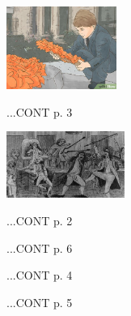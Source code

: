 \documentclass{article}
\begin{document}
\maketitle

\begin{floatingfigure}[l]{0.29\textwidth}
\includegraphics[width=0.27\textwidth]{images/img-02-09-01}
\end{floatingfigure}
\lipsum[1-2][2-15]
...CONT p. 3
\closearticle

\begin{floatingfigure}[r]{0.3\textwidth}
\includegraphics[width=0.29\textwidth]{images/img-02-09-02}
\end{floatingfigure}
\lipsum[3-4][1-13]
...CONT p. 2
\closearticle

\begin{multicols}{3}
\lipsum[6][2-8]
...CONT p. 6

\lipsum[7-8][5-14]
...CONT p. 4

\lipsum[11-12][2-11]
...CONT p. 5
\end{multicols}
\end{document}
